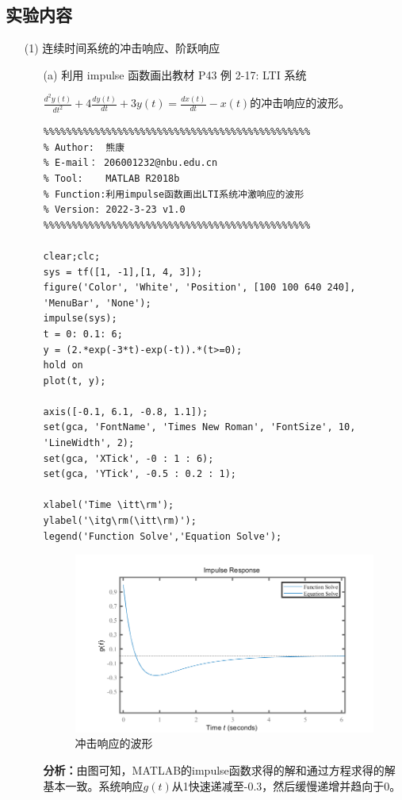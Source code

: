 \documentclass[UTF8,AutoFakeBold]{ctexart}
\begin{document}
	\subsection{{\heiti{}实验内容}}
	\begin{enumerate}
		\item[(1)] 连续时间系统的冲击响应、阶跃响应
		\begin{enumerate}
			\item[(a)] 利用 impulse 函数画出教材 P43 例 2-17: LTI 系统\par
				$\frac{d^2 y(t)}{d t^2}+4\frac{dy(t)}{dt}+3y(t)=\frac{dx(t)}{dt}-x(t)$的冲击响应的波形。
			
		\begin{lstlisting} 
%%%%%%%%%%%%%%%%%%%%%%%%%%%%%%%%%%%%%%%%%%%%%%% 
% Author:  熊康
% E-mail： 206001232@nbu.edu.cn
% Tool:    MATLAB R2018b
% Function:利用impulse函数画出LTI系统冲激响应的波形
% Version: 2022-3-23 v1.0
%%%%%%%%%%%%%%%%%%%%%%%%%%%%%%%%%%%%%%%%%%%%%%%

clear;clc;
sys = tf([1, -1],[1, 4, 3]);
figure('Color', 'White', 'Position', [100 100 640 240], 'MenuBar', 'None');
impulse(sys);
t = 0: 0.1: 6;
y = (2.*exp(-3*t)-exp(-t)).*(t>=0);
hold on
plot(t, y);

axis([-0.1, 6.1, -0.8, 1.1]);
set(gca, 'FontName', 'Times New Roman', 'FontSize', 10, 'LineWidth', 2);
set(gca, 'XTick', -0 : 1 : 6);
set(gca, 'YTick', -0.5 : 0.2 : 1);

xlabel('Time \itt\rm');
ylabel('\itg\rm(\itt\rm)');
legend('Function Solve','Equation Solve');
		\end{lstlisting}

		\begin{figure}[H]
			\centering
			\includegraphics[scale=0.6]{./figures/photo3.png}
			\caption{冲击响应的波形}
		\end{figure}
		\textbf{\songti 分析：}由图可知，MATLAB的impulse函数求得的解和通过方程求得的解基本一致。系统响应$g(t)$从1快速递减至-0.3，然后缓慢递增并趋向于0。 


\end{enumerate}
\end{enumerate}
\end{document}
